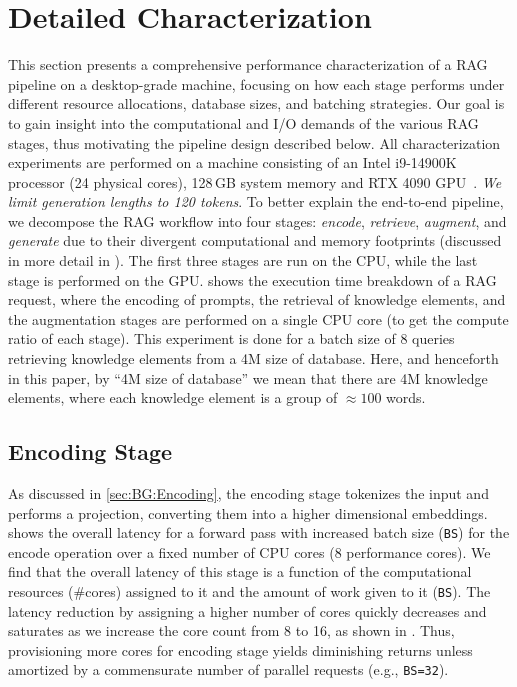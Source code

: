 \section{Detailed Characterization}
\label{sec:03Characterization}

This section presents a comprehensive performance characterization of a RAG pipeline on a desktop-grade machine, focusing on how each stage performs under different resource allocations, database sizes, and batching strategies. Our goal is to gain insight into the computational and I/O demands of the various RAG stages, thus motivating the pipeline design described below. All characterization experiments are performed on a machine consisting of an Intel i9-14900K~\cite{intel_cpu} processor (24 physical cores), 128\,GB system memory and RTX 4090 GPU~\cite{nvidia_rtx_gpu}. \emph{We limit generation lengths to 120 tokens}. To better explain the end-to-end pipeline, we decompose the RAG workflow into four stages: \emph{encode}, \emph{retrieve}, \emph{augment}, and \emph{generate} due to their divergent computational and memory footprints (discussed in more detail in ). The first three stages are run on the CPU, while the last stage is performed on the GPU.  shows the execution time breakdown of a RAG request, where the encoding of prompts, the retrieval of knowledge elements, and the augmentation stages are performed on a single CPU core (to get the compute ratio of each stage). This experiment is done for a batch size of 8 queries retrieving knowledge elements from a 4M size of database. Here, and henceforth in this paper, by ``4M size of database'' we mean that there are 4M knowledge elements, where each knowledge element is a group of $\approx100$ words.

\subsection{Encoding Stage}
\label{sec:char:Encoding}
As discussed in \ref{sec:BG:Encoding}, the encoding stage tokenizes the input and performs a projection, converting them into a higher dimensional embeddings.
 shows the overall latency for a forward pass with increased batch size (\texttt{BS}) for the encode operation over a fixed number of CPU cores (8 performance cores). 
We find that the overall latency of this stage is a function of the computational resources (\#cores) assigned to it and the amount of work given to it (\texttt{BS}). The latency reduction by assigning a higher number of cores quickly decreases and saturates as we increase the core count from 8 to 16, as shown in . Thus, provisioning more cores for encoding stage yields diminishing returns unless amortized by a commensurate number of parallel requests (e.g., \texttt{BS=32}). 

